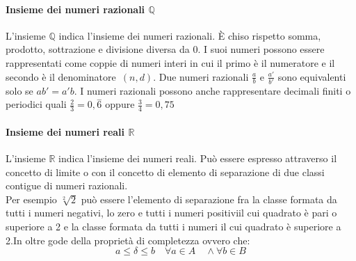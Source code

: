   \paragraph{Insieme dei numeri razionali $\mathbb{Q}$}
  L'insieme $\mathbb{Q}$ indica l'insieme dei numeri razionali. È chiso rispetto somma, prodotto, sottrazione e divisione diversa da 0. I suoi numeri possono essere rappresentati come coppie di numeri interi in cui il primo è il numeratore e il secondo è il denominatore~$(n,d)$. Due numeri razionali $\frac{a}{b}$ e $\frac{a'}{b'}$ sono equivalenti solo se $ab'=a'b$. I numeri razionali possono anche rappresentare decimali finiti o periodici quali 
  $\frac{2}{3}=0, \overset {\scriptscriptstyle-}{6} $ oppure
  $\frac{3}{4}=0,75 $

 \paragraph{Insieme dei numeri reali $\mathbb{R}$}
 L'insieme $\mathbb{R}$ indica l'insieme dei numeri reali. Può essere espresso attraverso il concetto di limite o con il concetto di elemento di separazione di due classi contigue di numeri razionali.\\
 Per esempio $\sqrt[2]{2}$ può essere l'elemento di separazione fra la classe formata da tutti i numeri negativi, lo zero e tutti i numeri positiviil cui quadrato è pari o superiore a 2 e la classe formata da tutti i numeri il cui quadrato è superiore a 2.In oltre gode della proprietà di completezza ovvero che:
 \[
 a \leq \delta \leq b \quad \forall a \in A \quad \wedge \forall b \in B
 \]
 

